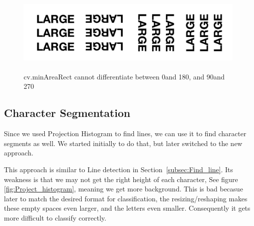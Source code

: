 \documentclass[Report.tex]{subfiles}
\begin{document}
\begin{flushleft}
    \begin{figure}[H]
      \centering
      \includegraphics[height=4cm]{res/4angle_rot.png}
      \caption{cv.minAreaRect cannot differentiate between 0\textdegree and 180\textdegree, and 90\textdegree and 270\textdegree}
      \label{fig:4angle_rot}
    \end{figure}

\end{flushleft}


\subsection{Character Segmentation}
\begin{flushleft}
Since we used Projection Histogram to find lines, we can use it to find character segments as well. We started initially to do that, but later switched to the new approach. \par
This approach is similar to Line detection in Section~\ref{subsec:Find_line}. Its weakness is that we may not get the right height of each character, See figure \ref{fig:Project_histogram}, meaning we get more background. This is bad becasue later to match the desired format for classification, the resizing/reshaping makes these empty spaces even larger, and the letters even smaller. Consequently it gets more difficult to classify correctly.
\end{flushleft}
\end{document}
